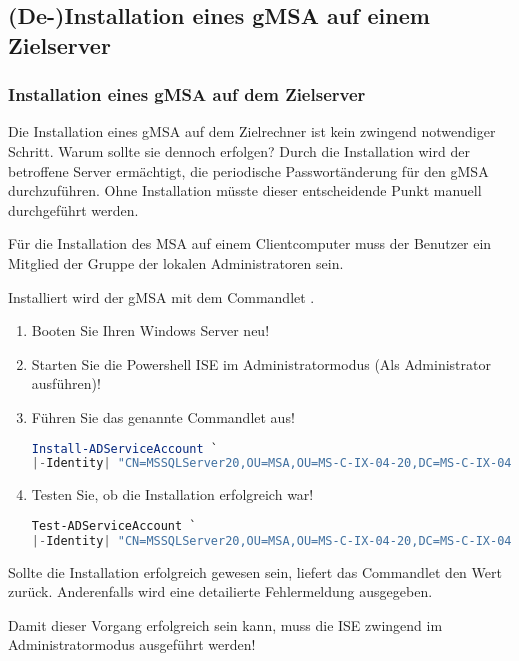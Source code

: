       \subsection{(De-)Installation eines gMSA auf einem Zielserver}
        \subsubsection{Installation eines gMSA auf dem Zielserver}
          Die Installation eines gMSA auf dem Zielrechner ist kein zwingend
          notwendiger Schritt. Warum sollte sie dennoch erfolgen? Durch die
          Installation wird der betroffene Server ermächtigt, die periodische
          Passwortänderung für den gMSA durchzuführen. Ohne Installation müsste
          dieser entscheidende Punkt manuell durchgeführt werden.
          \begin{merke}
            Für die Installation des MSA auf einem Clientcomputer muss der
            Benutzer ein Mitglied der Gruppe der lokalen Administratoren sein.
          \end{merke}
          Installiert wird der gMSA mit dem Commandlet
          .
          \begin{enumerate}
              \item Booten Sie Ihren Windows Server neu! 
              \item Starten Sie die Powershell ISE im Administratormodus (Als
              Administrator ausführen)!
              \item Führen Sie das genannte Commandlet aus!
                \begin{lstlisting}[language=powershell, caption={Einen MSA auf dem
                Zielserver installieren}, label=install_msa_1]
Install-ADServiceAccount `
|-Identity| "CN=MSSQLServer20,OU=MSA,OU=MS-C-IX-04-20,DC=MS-C-IX-04,DC=FUS"
                \end{lstlisting}
              \item Testen Sie, ob die Installation erfolgreich war!
                \begin{lstlisting}[language=powershell, caption={Prüfen des
                Installationserfolges}, label=install_msa_2]
Test-ADServiceAccount `
|-Identity| "CN=MSSQLServer20,OU=MSA,OU=MS-C-IX-04-20,DC=MS-C-IX-04,DC=FUS"
                \end{lstlisting}
          \end{enumerate}
          Sollte die Installation erfolgreich gewesen sein, liefert das Commandlet
           den Wert
           zurück. Anderenfalls wird eine detailierte
          Fehlermeldung ausgegeben.
          \begin{merke}
            Damit dieser Vorgang erfolgreich sein kann, muss die ISE zwingend im
            Administratormodus ausgeführt werden!
          \end{merke}
          \begin{literaturinternet}
            \item \cite{ee617223}
          \end{literaturinternet}
  \clearpage        
